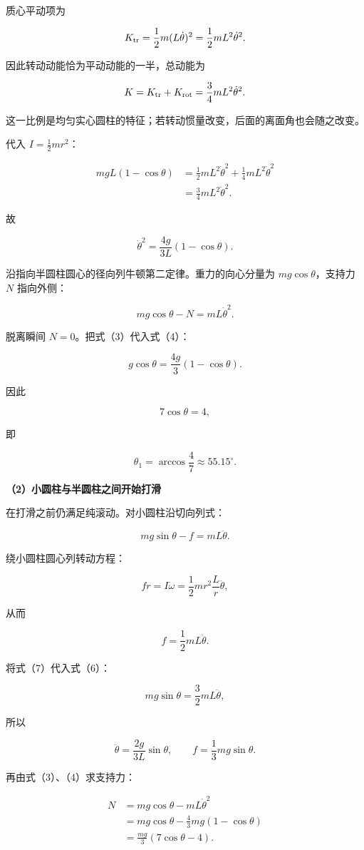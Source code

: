 \documentclass[12pt,a4paper,UTF8]{ctexart}
\begin{document}
质心平动项为

\[K_{\rm tr}=\frac12m(L\dot\theta)^2
=\frac12mL^2\dot\theta^2.\]

因此转动动能恰为平动动能的一半，总动能为

\[K=K_{\rm tr}+K_{\rm rot}
=\frac34mL^2\dot\theta^2.\]

这一比例是均匀实心圆柱的特征；若转动惯量改变，后面的离面角也会随之改变。

代入 \(I=\frac12mr^2\)：

\[\begin{aligned}
mgL(1-\cos\theta)
&=\frac12mL^2\dot\theta^2
+\frac14mL^2\dot\theta^2\\
&=\frac34mL^2\dot\theta^2.
\end{aligned}\]

故

\[\dot\theta^2=\frac{4g}{3L}(1-\cos\theta). \tag{3}\]

沿指向半圆柱圆心的径向列牛顿第二定律。重力的向心分量为
\(mg\cos\theta\)，支持力 \(N\) 指向外侧：

\[mg\cos\theta-N=mL\dot\theta^2. \tag{4}\]

脱离瞬间 \(N=0\)。把式（3）代入式（4）：

\[g\cos\theta=\frac{4g}{3}(1-\cos\theta).\]

因此

\[7\cos\theta=4,\]

即

\[\boxed{\theta_1=\arccos\frac47\approx55.15^\circ}. \tag{5}\]

\textbf{（2）小圆柱与半圆柱之间开始打滑}

在打滑之前仍满足纯滚动。对小圆柱沿切向列式：

\[mg\sin\theta-f=mL\ddot\theta. \tag{6}\]

绕小圆柱圆心列转动方程：

\[fr=I\dot\omega
=\frac12mr^2\frac{L}{r}\ddot\theta,\]

从而

\[f=\frac12mL\ddot\theta. \tag{7}\]

将式（7）代入式（6）：

\[mg\sin\theta=\frac32mL\ddot\theta,\]

所以

\[\ddot\theta=\frac{2g}{3L}\sin\theta,\qquad
f=\frac13mg\sin\theta. \tag{8}\]

再由式（3）、（4）求支持力：

\[\begin{aligned}
N
&=mg\cos\theta-mL\dot\theta^2\\
&=mg\cos\theta-\frac43mg(1-\cos\theta)\\
&=\frac{mg}{3}(7\cos\theta-4).
\end{aligned} \tag{9}\]
\end{document}
